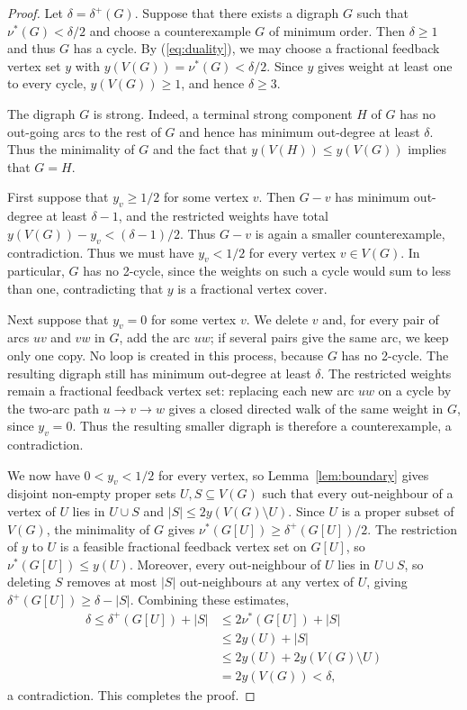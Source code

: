 \documentclass[10pt,a4paper]{article}
\numberwithin{equation}{section}
\begin{document}
\begin{proof}
Let $\delta=\delta^+(G)$. Suppose that there exists a digraph $G$ such that $\nu^\ast(G)<\delta/2$ and choose a counterexample $G$ of minimum order. Then $\delta\ge 1$ and thus $G$ has a cycle. 
 By (\ref{eq:duality}), we may choose a
fractional feedback vertex set $y$ with 
$y(V(G))=\nu^\ast(G)<\delta/2$. Since $y$ gives weight at least one to every cycle, $y(V(G))\ge1$, and
hence $\delta\ge3$.

The digraph $G$ is strong. Indeed, a terminal strong component $H$ of $G$ has no out-going 
arcs to the rest of $G$ and hence has  minimum out-degree at least $\delta$. Thus the minimality of $G$ and the fact that $y(V(H))\leq y(V(G))$ implies that $G=H$.

First suppose that $y_v\ge1/2$ for some vertex $v$.
Then $G-v$ has minimum out-degree at least $\delta-1$, and the
restricted weights have total $y(V(G))-y_v<(\delta-1)/2$. Thus $G-v$ is again a smaller counterexample, contradiction. Thus we must have $y_v<1/2$ for every
vertex $v\in V(G)$. In particular, $G$ has no 2-cycle,
since the weights on such a cycle would sum to less than one, contradicting that $y$ is a fractional vertex cover.

Next suppose that $y_v=0$ for some vertex $v$. We delete $v$ and, for
every pair of arcs $uv$ and $vw$ in $G$, add the arc $uw$; if several
pairs give the same arc, we keep only one copy. No loop is created in
this process, because $G$ has no 2-cycle. The resulting digraph still has minimum out-degree at least $\delta$. The
restricted weights remain a fractional feedback vertex set: replacing each
new arc $uw$ on a cycle by the two-arc path $u\to v\to w$ gives a closed
directed walk of the same weight in $G$, since $y_v=0$.
Thus the resulting smaller digraph is therefore a counterexample, a
contradiction.

We now have $0<y_v<1/2$ for every vertex, so Lemma~\ref{lem:boundary}
gives disjoint non-empty proper sets $U,S\subseteq V(G)$ such that every
out-neighbour of a vertex of $U$ lies in $U\cup S$ and
$|S|\le2y(V(G)\setminus U)$.
Since $U$ is a proper subset of $V(G)$, the minimality of $G$ gives
$\nu^\ast(G[U])\ge\delta^+(G[U])/2$. The restriction of $y$ to $U$ is a
feasible fractional feedback vertex set on $G[U]$, so
$\nu^\ast(G[U])\le y(U)$. Moreover, every out-neighbour of $U$ lies in
$U\cup S$, so deleting $S$ removes at most $|S|$ out-neighbours at any
vertex of $U$, giving $\delta^+(G[U])\ge\delta-|S|$. Combining these
estimates,
$$
\begin{aligned}
\delta
\le\delta^+(G[U])+|S|&\le2\nu^\ast(G[U])+|S|\\
&\le2y(U)+|S|\\
&\le2y(U)+2y(V(G)\setminus U)\\
&=2y(V(G))<\delta,
\end{aligned}
$$
a contradiction. This completes the proof.
\end{proof}
\end{document}
